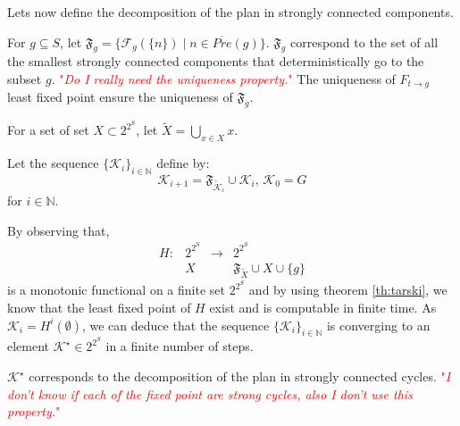 \documentclass{article}
\newcommand\comment[1]{\textcolor{red}{"\textit{#1}"}}
\theoremstyle{named}
\newcommand{\inpre}{ \ensuremath{\overline{Pre} } }
\begin{document}
Lets now define the decomposition of the plan in strongly connected components.

For $g \subseteq S$, let $\mathfrak{F}_g = \{ \mathcal{F}_g(\{n\}) \mid n \in \inpre(g) \}$.
$\mathfrak{F}_g$ correspond to the set of all the smallest strongly connected components that deterministically go to the subset $g$.
\comment{Do I really need the uniqueness property.}
The uniqueness of  $F_{t \rightarrow g}$ least fixed point ensure the uniqueness of $\mathfrak{F}_g$.

For a set of set $X \subset 2^{2^S}$, let $\tilde{X} = \bigcup_{x \in X} x$.

Let the sequence $\{\mathcal{K}_i\}_{i \in \mathbb{N}}$ define by:
\begin{equation*}
\mathcal{K}_{i+1}  = \mathfrak{F}_{\tilde{\mathcal{K}}_i} \cup \mathcal{K}_i
\textrm{, }
\mathcal{K}_0 = G
\end{equation*}
for $i \in \mathbb{N}$. 

By observing that,
\begin{equation}
\begin{array}{llll}
H : &2^{2^S} &\rightarrow &2^{2^S}\\
&X & & \mathfrak{F}_{\tilde{X}} \cup X \cup \{ g \}
\end{array}
\end{equation}
is a monotonic functional on a finite set $2^{2^S}$ and by using theorem \ref{th:tarski}, we know that the least fixed point of $H$ exist and is computable in finite time.
As $\mathcal{K}_i = H^i(\emptyset)$, we can deduce that the sequence $\{\mathcal{K}_i\}_{i \in \mathbb{N}}$ is converging to an element $\mathcal{K}^\star \in 2^{2^S}$ in a finite number of steps.

$\mathcal{K}^\star$ corresponds to the decomposition of the plan in strongly connected cycles.
\comment{I don't know if each of the fixed point are strong cycles, also I don't use this property.}
\end{document}
